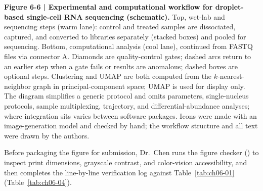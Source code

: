 \begin{BookNote}
\textbf{Figure 6-6 | Experimental and computational workflow for droplet-based single-cell RNA sequencing (schematic).} Top, wet-lab and sequencing steps (warm lane): control and treated samples are dissociated, captured, and converted to libraries separately (stacked boxes) and pooled for sequencing. Bottom, computational analysis (cool lane), continued from FASTQ files via connector A. Diamonds are quality-control gates; dashed arcs return to an earlier step when a gate fails or results are anomalous; dashed boxes are optional steps. Clustering and UMAP are both computed from the $k$-nearest-neighbor graph in principal-component space; UMAP is used for display only. The diagram simplifies a generic protocol and omits parameters, single-nucleus protocols, sample multiplexing, trajectory, and differential-abundance analyses; where integration sits varies between software packages. Icons were made with an image-generation model and checked by hand; the workflow structure and all text were drawn by the authors.
\end{BookNote}

Before packaging the figure for submission, Dr.\ Chen runs the \scidraw{} figure checker () to inspect print dimensions, grayscale contrast, and color-vision accessibility, and then completes the line-by-line verification log against Table~\ref{tab:ch06-01} (Table~\ref{tab:ch06-04}).

